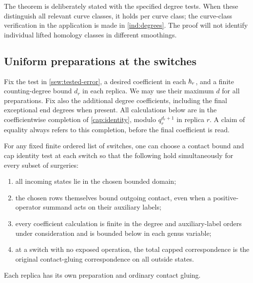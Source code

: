 The theorem is deliberately stated with the specified degree tests.
When these distinguish all relevant curve classes, it holds per curve
class; the curve-class verification in the application is made in
\cref{ind:degrees}.  The proof will not identify individual lifted
homology classes in different smoothings.

\subsection{Uniform preparations at the switches}

Fix the test in \eqref{sew:tested-error}, a desired coefficient in each
$\hbar_r$, and a finite counting-degree bound $d_r$ in each replica.  We
may use their maximum $d$ for all preparations.  Fix also the
additional degree coefficients, including the final exceptional end
degrees when present.  All calculations below are in the
coefficientwise completion of \cref{cap:identity}, modulo
$q_r^{d_r+1}$ in replica $r$.  A claim of equality always refers to
this completion, before the final coefficient is read.

\begin{lemma}\label{sew:preparation}
For any fixed finite ordered list of switches, one can choose a
contact bound and cap identity test at each switch so that the
following hold simultaneously for every subset of surgeries:
\begin{enumerate}[label=\textup{(\roman*)}]
 \item all incoming states lie in the chosen bounded domain;
 \item the chosen rows themselves bound outgoing contact, even when a
 positive-operator summand acts on their auxiliary labels;
 \item every coefficient calculation is finite in the degree and
 auxiliary-label orders under consideration and is bounded below in
 each genus variable;
 \item at a switch with no exposed operation, the total capped
 correspondence is the original contact-gluing correspondence on all
 outside states.
\end{enumerate}
Each replica has its own preparation and ordinary contact gluing.
\end{lemma}

